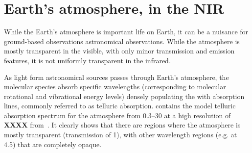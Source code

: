 
\section{Earth's atmosphere, in the NIR}

While the Earth's atmosphere is important life on Earth, it can be a nuisance for ground-based observations astronomical observations.
While the atmosphere is mostly transparent in the visible, with only minor transmission and emission features, it is not uniformly transparent in the infrared.

As light form astronomical sources passes through Earth's atmosphere, the molecular species absorb specific wavelengths (corresponding to molecular rotational and vibrational energy levels) densely populating the \nir{} with absorption lines, commonly referred to as telluric absorption.  contains the model telluric absorption spectrum for the atmosphere from 0.3--30\um{} at a high resolution of \textbf{XXXX} from~\citet{smette_molecfit_2015}.
It clearly shows that there are regions where the atmosphere is mostly transparent (transmission of 1), with other wavelength regions (e.g. at 4.5\um) that are completely opaque.

